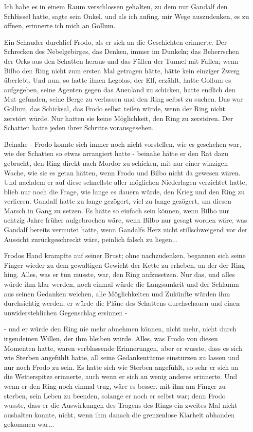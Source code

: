 \glqq Ich habe es in einem Raum verschlossen gehalten, zu dem nur Gandalf den
Schlüssel hatte\grqq{}, sagte sein Onkel, \glqq und als ich anfing, mir Wege
auszudenken, es zu öffnen, erinnerte ich mich an Gollum.\grqq{}

Ein Schauder durchlief Frodo, als er sich an die Geschichten erinnerte. Der
Schrecken des Nebelgebirges, das Denken, immer im Dunkeln; das Beherrschen der
Orks aus den Schatten heraus und das Füllen der Tunnel mit Fallen; wenn Bilbo
den Ring nicht zum ersten Mal getragen hätte, hätte kein einziger Zwerg
überlebt. Und nun, so hatte ihnen Legolas, der Elf, erzählt, hatte Gollum es
aufgegeben, seine Agenten gegen das Auenland zu schicken, hatte endlich den Mut
gefunden, seine Berge zu verlassen und den Ring selbst zu suchen. Das war
Gollum, das Schicksal, das Frodo selbst teilen würde, wenn der Ring nicht
zerstört würde. Nur hatten sie keine Möglichkeit, den Ring zu zerstören. Der
Schatten hatte jeden ihrer Schritte vorausgesehen.

Beinahe - Frodo konnte sich immer noch nicht vorstellen, wie es geschehen war,
wie der Schatten so etwas arrangiert hatte - beinahe hätte er den Rat dazu
gebracht, den Ring direkt nach Mordor zu schicken, mit nur einer winzigen Wache,
wie sie es getan hätten, wenn Frodo und Bilbo nicht da gewesen wären. Und
nachdem er auf diese schnellste aller möglichen Niederlagen verzichtet hatte,
blieb nur noch die Frage, wie lange es dauern würde, den Krieg und den Ring zu
verlieren. Gandalf hatte zu lange gezögert, viel zu lange gezögert, um diesen
Marsch in Gang zu setzen. Es hätte so einfach sein können, wenn Bilbo nur
achtzig Jahre früher aufgebrochen wäre, wenn Bilbo nur gesagt worden wäre, was
Gandalf bereits vermutet hatte, wenn Gandalfs Herz nicht stillschweigend vor der
Aussicht zurückgeschreckt wäre, peinlich falsch zu liegen...

Frodos Hand krampfte auf seiner Brust; ohne nachzudenken, begannen sich seine
Finger wieder zu dem gewaltigen Gewicht der Kette zu erheben, an der der Ring
hing. Alles, was er tun musste, war, den Ring aufzusetzen. Nur das, und alles
würde ihm klar werden, noch einmal würde die Langsamkeit und der Schlamm aus
seinen Gedanken weichen, alle Möglichkeiten und Zukünfte würden ihm durchsichtig
werden, er würde die Pläne des Schattens durchschauen und einen
unwiderstehlichen Gegenschlag ersinnen -

- und er würde den Ring nie mehr abnehmen können, nicht mehr, nicht durch
irgendeinen Willen, der ihm bleiben würde. Alles, was Frodo von diesen Momenten
hatte, waren verblassende Erinnerungen, aber er wusste, dass es sich wie Sterben
angefühlt hatte, all seine Gedankentürme einstürzen zu lassen und nur noch Frodo
zu sein. Es hatte sich wie Sterben angefühlt, so sehr er sich an die
Wetterspitze erinnerte, auch wenn er sich an wenig anderes erinnerte. Und wenn
er den Ring noch einmal trug, wäre es besser, mit ihm am Finger zu sterben, sein
Leben zu beenden, solange er noch er selbst war; denn Frodo wusste, dass er die
Auswirkungen des Tragens des Rings ein zweites Mal nicht aushalten konnte,
nicht, wenn ihm danach die grenzenlose Klarheit abhanden gekommen war...

